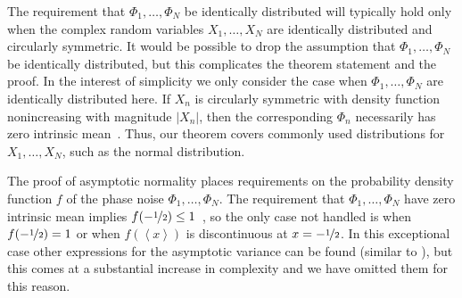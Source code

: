\documentclass[aap]{imsart}
\newcommand{\fracpart}[1]{\left\langle #1 \right\rangle}
\newcommand{\abs}[1]{\left\vert #1 \right\vert}
\begin{document}
The requirement that $\Phi_1, \dots, \Phi_N$ be identically distributed will typically hold only when the complex random variables $X_1, \dots, X_N$ are identically distributed and circularly symmetric.  It would be possible to drop the assumption that $\Phi_1, \dots, \Phi_N$ be identically distributed, but this complicates the theorem statement and the proof.  In the interest of simplicity we only consider the case when $\Phi_1, \dots, \Phi_N$ are identically distributed here.  If $X_n$ is circularly symmetric with density function nonincreasing with magnitude $\abs{X_n}$, then the corresponding $\Phi_n$ necessarily has zero intrinsic mean~\cite[Theorem 5.2]{McKilliam2010thesis}.  Thus, our theorem covers commonly used distributions for $X_1, \dots, X_N$, such as the normal distribution.

The proof of asymptotic normality places requirements on the probability density function $f$ of the phase noise $\Phi_1, \dots, \Phi_N$.  The requirement that $\Phi_1, \dots, \Phi_N$ have zero intrinsic mean implies $f(-\nicefrac{1}{2}) \leq 1$~\cite[Lemma~1]{McKilliam_mean_dir_est_sq_arc_length2010}, so the only case not handled is when $f(-\nicefrac{1}{2}) = 1$ or when $f(\fracpart{x})$ is discontinuous at $x = -\nicefrac{1}{2}$. In this exceptional case other expressions for the asymptotic variance can be found (similar to \cite[Theorem 3.1]{Hotz_circle_means_2011}), but this comes at a substantial increase in complexity and we have omitted them for this reason. %
\end{document}
